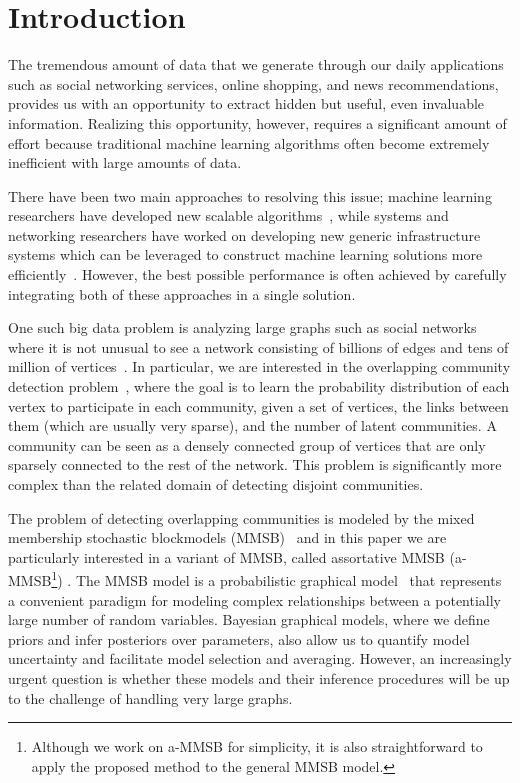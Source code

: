 \section{Introduction}
The tremendous amount of data that we generate through our daily applications such as social networking services, online shopping, and news recommendations, provides us with an opportunity to extract hidden but useful, even invaluable information. Realizing this opportunity, however, requires a significant amount of effort because traditional machine learning algorithms often become extremely inefficient with large amounts of data.

There have been two main approaches to resolving this issue; machine learning researchers have developed new scalable algorithms~\cite{bottou2010large, boyd2011distributed}, while systems and networking researchers have worked on developing new generic infrastructure systems which can be leveraged to construct machine learning solutions more efficiently~\cite{dean2008mapreduce, chang2008bigtable}.
However, the best possible performance is often achieved by carefully integrating both of these approaches in a single solution.

One such big data problem is analyzing large graphs such as social networks where it is not unusual to see a network consisting of billions of edges and tens of million of vertices~\cite{yang2015defining}. In particular, we are interested in the overlapping community detection problem~\cite{xie2013overlapping}, where the goal is to learn the probability distribution of each vertex to participate in each community, given a set of vertices, the links between them (which are usually very sparse), and the number of latent communities. A community can be seen as a densely connected group of vertices that are only sparsely connected to the rest of the network. This problem is significantly more complex than the related domain of detecting disjoint communities.

The problem of detecting overlapping communities is modeled by the mixed membership stochastic blockmodels (MMSB)~\cite{airoldi2009mixed} and in this paper we are particularly interested in a variant of MMSB, called assortative MMSB (a-MMSB\footnote{Although we work on a-MMSB for simplicity, it is also straightforward to apply the proposed method to the general MMSB model.}) \cite{gopalan2012scalable}.
The MMSB model is a probabilistic graphical model~\cite{koller2009probabilistic} that represents a convenient paradigm for modeling complex relationships between a potentially large number of random variables. Bayesian graphical models, where we define priors and infer posteriors over parameters, also allow us to quantify model uncertainty and facilitate model selection and averaging. However, an increasingly urgent question is whether these models and their inference procedures will be up to the challenge of handling very large graphs.

